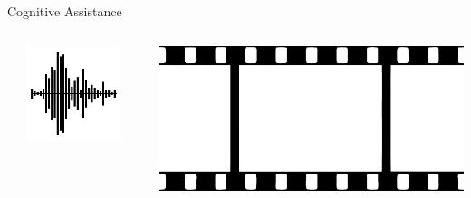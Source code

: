 \documentclass[aspectratio=1610]{beamer}
\begin{document}
\begin{frame}{Cognitive Assistance}
    \begin{columns}[onlytextwidth]
        \begin{column}{.335\linewidth}%
        \end{column}%
        \begin{column}{.1\linewidth}
            \centering%
            \includegraphics[width=\linewidth]{img/sound_wave.png}
        \end{column}%
        \begin{column}{.01\linewidth}
        \end{column}%
        \begin{column}{.1\linewidth}
            \centering%
            \includegraphics[width=\linewidth]{img/film.png}

\end{column}
\end{columns}
\end{frame}
\end{document}

